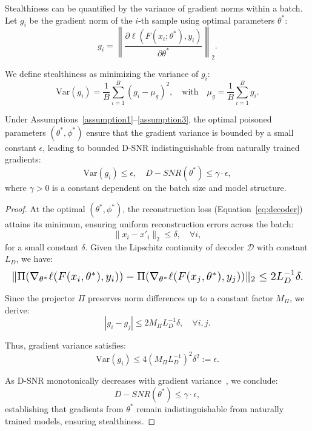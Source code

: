 Stealthiness can be quantified by the variance of gradient norms within a batch. Let $g_i$ be the gradient norm of the $i$-th sample using optimal parameters $\theta^*$:
\begin{equation}
g_i = \left\|\frac{\partial \ell(F(x_i; \theta^*), y_i)}{\partial \theta^*}\right\|_2.
\end{equation}

We define stealthiness as minimizing the variance of $g_i$:
\begin{equation}
\mathrm{Var}(g_i) = \frac{1}{B}\sum_{i=1}^{B}(g_i - \mu_g)^2, \quad \text{with} \quad \mu_g = \frac{1}{B}\sum_{i=1}^{B} g_i.
\end{equation}

\begin{theorem}
Under Assumptions~\ref{assumption1}--\ref{assumption3}, the optimal poisoned parameters $(\theta^*, \phi^*)$ ensure that the gradient variance is bounded by a small constant $\epsilon$, leading to bounded D-SNR indistinguishable from naturally trained gradients:
\begin{equation}
\mathrm{Var}(g_i) \leq \epsilon, \quad D-SNR(\theta^*) \leq \gamma\cdot\epsilon,
\end{equation}
where $\gamma>0$ is a constant dependent on the batch size and model structure.
\end{theorem}

\begin{proof}
At the optimal $(\theta^*,\phi^*)$, the reconstruction loss (Equation~\eqref{eq:decoder}) attains its minimum, ensuring uniform reconstruction errors across the batch:
\begin{equation}
\|x_i - x'_i\|_2 \leq \delta, \quad \forall i,
\end{equation}
for a small constant $\delta$. Given the Lipschitz continuity \cite{rudin1976principles} of decoder $\mathcal{D}$ with constant $L_D$, we have:
\begin{equation}
\resizebox{\linewidth}{!}{$
\|\Pi(\nabla_{\theta^*}\ell(F(x_i,\theta^*),y_i))-\Pi(\nabla_{\theta^*}\ell(F(x_j,\theta^*),y_j))\|_2 \leq 2L_D^{-1}\delta.
$}
\end{equation}

Since the projector $\Pi$ preserves norm differences up to a constant factor $M_\Pi$, we derive:
\begin{equation}
|g_i - g_j| \leq 2M_\Pi L_D^{-1}\delta, \quad \forall i,j.
\end{equation}

Thus, gradient variance satisfies:
\begin{equation}
\mathrm{Var}(g_i) \leq 4(M_\Pi L_D^{-1})^2\delta^2 := \epsilon.
\end{equation}

As D-SNR monotonically decreases with gradient variance~\cite{Garov2024Hiding}, we conclude:
\begin{equation}
D-SNR(\theta^*)\leq \gamma\cdot\epsilon,
\end{equation}
establishing that gradients from $\theta^*$ remain indistinguishable from naturally trained models, ensuring stealthiness.
\end{proof}



